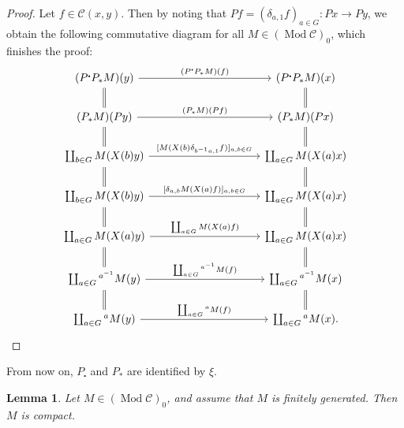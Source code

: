 \documentclass{surv-l}
\numberwithin{equation}{chapter}
\numberwithin{figure}{chapter}
\theoremstyle{plain}
\newtheorem{lem}[thm]{Lemma}
\theoremstyle{definition}
\theoremstyle{remark}
\newcommand{\Ar}[3]{\ar[from={#1}, to={#2}, #3]}
\DeclareMathOperator{\Mod}{Mod}
\begin{document}
\begin{proof}
Let $f \in {\mathcal{C}}(x, y)$.
Then by noting that $Pf = (\delta_{a,1}f)_{a\in G} \colon Px \to Py$,
we obtain the following commutative diagram for all $M \in (\Mod{\mathcal{C}})_0$, which finishes the proof:
\[
\begin{tikzcd}[column sep=10em]
(P^{\centerdot} P_* M)(y) & (P^{\centerdot} P_* M)(x)\\
(P_* M)(Py) & (P_* M)(Px)\\
\coprod_{b\in G}M(X(b)y) & \coprod_{a\in G}M(X(a)x)\\
\coprod_{b\in G}M(X(b)y) & \coprod_{a\in G}M(X(a)x)\\
\coprod_{a\in G}M(X(a)y) & \coprod_{a\in G}M(X(a)x)\\
\coprod_{a\in G}{}^{a^{-1}}M(y) & \coprod_{a\in G}{}^{a^{-1}}M(x)\\
\coprod_{a\in G}{}^{a}M(y) & \coprod_{a\in G}{}^{a}M(x).
\Ar{1-1}{1-2}{"(P^{\centerdot} P_* M)(f)"}
\Ar{2-1}{2-2}{"(P_* M)(Pf)"}
\Ar{3-1}{3-2}{"{[M(X(b)\delta_{b^{-1} a, 1}f)]_{a,b\in G}}"}
\Ar{4-1}{4-2}{"{[\delta_{a,b}M(X(a)f)]_{a,b\in G}}"}
\Ar{5-1}{5-2}{"\coprod_{a\in G}M(X(a)f)"}
\Ar{6-1}{6-2}{"\coprod_{a\in G}{}^{a^{-1}}M(f)"}
\Ar{7-1}{7-2}{"\coprod_{a\in G}{}^{a}M(f)"}
\Ar{1-1}{2-1}{equal}
\Ar{2-1}{3-1}{equal}
\Ar{3-1}{4-1}{equal}
\Ar{4-1}{5-1}{equal}
\Ar{5-1}{6-1}{equal}
\Ar{6-1}{7-1}{equal}
\Ar{1-2}{2-2}{equal}
\Ar{2-2}{3-2}{equal}
\Ar{3-2}{4-2}{equal}
\Ar{4-2}{5-2}{equal}
\Ar{5-2}{6-2}{equal}
\Ar{6-2}{7-2}{equal}
\end{tikzcd}
\]
\end{proof}

From now on, $P_{\centerdot}$ and $P_*$ are identified by $\xi$.

\begin{lem}\label{lem:fg-compact}
Let $M \in (\Mod{\mathcal{C}})_0$, and assume that
$M$ is finitely generated.
Then $M$ is compact.
\end{lem}
\end{document}
